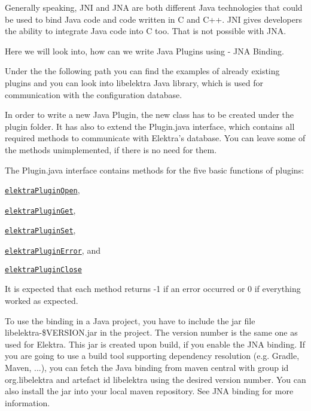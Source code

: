 Generally speaking, {\ttfamily J\+NI} and {\ttfamily J\+NA} are both different Java technologies that could be used to bind Java code and code written in C and C++. {\ttfamily J\+NI} gives developers the ability to integrate Java code into C too. That is not possible with {\ttfamily J\+NA}.

Here we will look into, how can we write Java Plugins using -\/ {\ttfamily J\+NA Binding}.

Under the the following path you can find the examples of already existing plugins and you can look into libelektra Java library, which is used for communication with the configuration database.

In order to write a new Java Plugin, the new class has to be created under the {\ttfamily plugin} folder. It has also to extend the {\ttfamily Plugin.\+java} interface, which contains all required methods to communicate with Elektra’s database. You can leave some of the methods unimplemented, if there is no need for them.

The {\ttfamily Plugin.\+java} interface contains methods for the five basic functions of plugins\+:


\begin{DoxyItemize}
\item \href{https://doc.libelektra.org/api/latest/html/group__plugin.html#ga23c2eb3584e38a4d494eb8f91e5e3d8d}{\tt {\ttfamily elektra\+Plugin\+Open}},
\item \href{https://doc.libelektra.org/api/latest/html/group__plugin.html#gacb69f3441c6d84241b4362f958fbe313}{\tt {\ttfamily elektra\+Plugin\+Get}},
\item \href{https://doc.libelektra.org/api/latest/html/group__plugin.html#gae65781a1deb34efc79c8cb9d9174842c}{\tt {\ttfamily elektra\+Plugin\+Set}},
\item \href{https://doc.libelektra.org/api/latest/html/group__plugin.html#gad74b35f558ac7c3262f6069c5c47dc79}{\tt {\ttfamily elektra\+Plugin\+Error}}, and
\item \href{https://doc.libelektra.org/api/latest/html/group__plugin.html#ga1236aefe5b2baf8b7bf636ba5aa9ea29}{\tt {\ttfamily elektra\+Plugin\+Close}}
\end{DoxyItemize}

It is expected that each method returns -\/1 if an error occurred or 0 if everything worked as expected.

To use the binding in a Java project, you have to include the jar file {\ttfamily libelektra-\/\$\+V\+E\+R\+S\+I\+O\+N.\+jar} in the project. The version number is the same one as used for Elektra. This jar is created upon build, if you enable the J\+NA binding. If you are going to use a build tool supporting dependency resolution (e.\+g. Gradle, Maven, ...), you can fetch the Java binding from maven central with group id {\ttfamily org.\+libelektra} and artefact id {\ttfamily libelektra} using the desired version number. You can also install the jar into your local maven repository. See J\+NA binding for more information. 